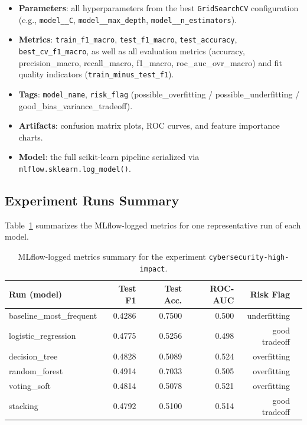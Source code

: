 \documentclass[a4paper,12pt]{article}
\begin{document}
\begin{itemize}[leftmargin=2cm]
    \item \textbf{Parameters}: all hyperparameters from the best \texttt{GridSearchCV} configuration (e.g., \texttt{model\_\_C}, \texttt{model\_\_max\_depth}, \texttt{model\_\_n\_estimators}).
    \item \textbf{Metrics}: \texttt{train\_f1\_macro}, \texttt{test\_f1\_macro}, \texttt{test\_accuracy}, \texttt{best\_cv\_f1\_macro}, as well as all evaluation metrics (accuracy, precision\_macro, recall\_macro, f1\_macro, roc\_auc\_ovr\_macro) and fit quality indicators (\texttt{train\_minus\_test\_f1}).
    \item \textbf{Tags}: \texttt{model\_name}, \texttt{risk\_flag} (possible\_overfitting / possible\_underfitting / good\_bias\_variance\_tradeoff).
    \item \textbf{Artifacts}: confusion matrix plots, ROC curves, and feature importance charts.
    \item \textbf{Model}: the full scikit-learn pipeline serialized via \texttt{mlflow.sklearn.log\_model()}.
\end{itemize}

\subsection{Experiment Runs Summary}

Table~\ref{tab:mlflow} summarizes the MLflow-logged metrics for one representative run of each model.

\begin{table}[H]
\centering
\caption{MLflow-logged metrics summary for the experiment \texttt{cybersecurity-high-impact}.}
\label{tab:mlflow}
\begin{tabular}{lrrrrr}
\toprule
\textbf{Run (model)} & \textbf{Test F1} & \textbf{Test Acc.} & \textbf{ROC-AUC} & \textbf{Risk Flag} \\
\midrule
baseline\_most\_frequent & 0.4286 & 0.7500 & 0.500 & underfitting \\
logistic\_regression     & 0.4775 & 0.5256 & 0.498 & good tradeoff \\
decision\_tree           & 0.4828 & 0.5089 & 0.524 & overfitting \\
random\_forest           & 0.4914 & 0.7033 & 0.505 & overfitting \\
voting\_soft             & 0.4814 & 0.5078 & 0.521 & overfitting \\
stacking                 & 0.4792 & 0.5100 & 0.514 & good tradeoff \\
\bottomrule
\end{tabular}
\end{table}
\end{document}
